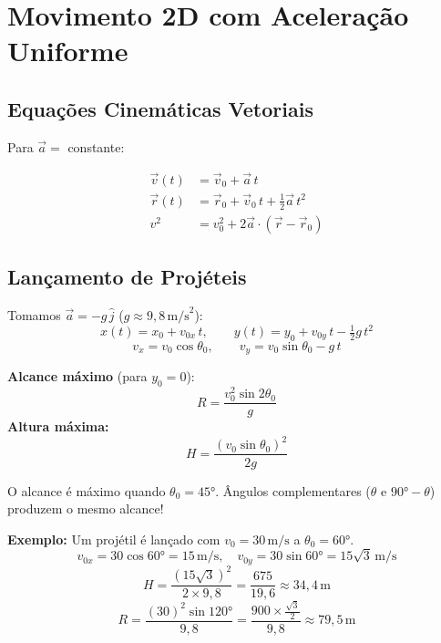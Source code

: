 \documentclass[10.5pt, a4paper]{extarticle}
\begin{document}
\section{Movimento 2D com Aceleração Uniforme}

\subsection{Equações Cinemáticas Vetoriais}

Para $\vec{a} = $ constante:

\begin{definicaobox}
\begin{align}
  \vec{v}(t) &= \vec{v}_0 + \vec{a}\,t \\[4pt]
  \vec{r}(t) &= \vec{r}_0 + \vec{v}_0\,t + \tfrac{1}{2}\vec{a}\,t^2 \\[4pt]
  v^2 &= v_0^2 + 2\vec{a}\cdot(\vec{r}-\vec{r}_0)
\end{align}
\end{definicaobox}

\subsection{Lançamento de Projéteis}

Tomamos $\vec{a} = -g\,\hat{j}$ ($g \approx 9{,}8\,\text{m/s}^2$):
\[
  x(t) = x_0 + v_{0x}\,t, \qquad y(t) = y_0 + v_{0y}\,t - \tfrac{1}{2}g\,t^2
\]
\[
  v_x = v_0\cos\theta_0, \qquad v_y = v_0\sin\theta_0 - g\,t
\]

\textbf{Alcance máximo} (para $y_0 = 0$):
\[
  R = \frac{v_0^2 \sin 2\theta_0}{g}
\]
\textbf{Altura máxima:}
\[
  H = \frac{(v_0 \sin\theta_0)^2}{2g}
\]

\begin{pikabox}
O alcance é máximo quando $\theta_0 = 45°$. Ângulos complementares ($\theta$ e $90° - \theta$) produzem o mesmo alcance!
\end{pikabox}

\begin{bulbabox}
\textbf{Exemplo:} Um projétil é lançado com $v_0 = 30\,\text{m/s}$ a $\theta_0 = 60°$.
\[
  v_{0x} = 30\cos 60° = 15\,\text{m/s}, \quad v_{0y} = 30\sin 60° = 15\sqrt{3}\,\text{m/s}
\]
\[
  H = \frac{(15\sqrt{3})^2}{2 \times 9{,}8} = \frac{675}{19{,}6} \approx 34{,}4\,\text{m}
\]
\[
  R = \frac{(30)^2 \sin 120°}{9{,}8} = \frac{900 \times \frac{\sqrt{3}}{2}}{9{,}8} \approx 79{,}5\,\text{m}
\]
\end{bulbabox}
\end{document}
